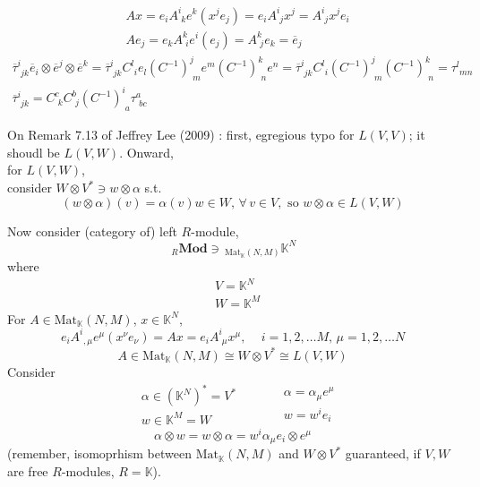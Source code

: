 \documentclass[10pt]{amsart}
\begin{document}
\begin{multicols*}{2}
\[
\begin{aligned}
	&	Ax = e_i A^i_{ \, \, k} e^k(x^j e_j) = e_i A^i_{ \,\,j} x^j = A^i_{ \, \, j} x^j e_i \\ 
 & Ae_j = e_k A^k_{ \, \, i} e^i (e_j) = A^k_{ \,\, j} e_k = \overline{e}_j
\end{aligned}
\]
\[
\begin{gathered}
\overline{\tau}^i_{ \,\, jk} \overline{e}_i \otimes \overline{e}^j \otimes \overline{e}^k = \overline{\tau}^i_{ \, \, jk} C^l_{ \, \, i} e_l (C^{-1})^j_{ \,\, m} e^m(C^{-1})^k_{ \, \, n} e^n = \overline{\tau}^i_{ \, \, jk} C^l_{ \, \, i } (C^{-1})^j_{ \,\, m} (C^{-1})^k_{ \,\, n} = \tau^l_{ \,\, mn}   \\
\overline{\tau}^i_{ \,\, jk} = C^c_{ \,\, k} C^b_{ \,\, j} (C^{-1})^i_{ \,\, a} \tau^a_{\,\, bc}
\end{gathered}
\]



On Remark 7.13 of Jeffrey Lee (2009) \cite{JLee2009}:  first, egregious typo for $L(V,V)$; it shoudl be $L(V,W)$.  Onward, \\
for $L(V,W)$, \\
consider $W\otimes V^* \ni w\otimes \alpha$ s.t.
\[
(w\otimes \alpha)(v) = \alpha(v)w\in W, \, \forall \, v\in V, \text{ so } w\otimes \alpha \in L(V,W)
\]

Now consider (category of) left $R$-module, 
\begin{equation}
{\,}_R\textbf{Mod} \ni {\,}_{\text{Mat}_{\mathbb{K}}(N,M) } \mathbb{K}^N
\end{equation}
where
\[
\begin{aligned}
	& V=\mathbb{K}^N \\ 
&	  W = \mathbb{K}^M
\end{aligned}
\]
For $A\in \text{Mat}_{\mathbb{K}}(N,M)$, $x\in \mathbb{K}^N$, 
\[
e_i A^i_{ \,\ , \mu} e^{\mu}(x^{\nu} e_{\nu}) = Ax = e_iA^i_{\,\, \mu} x^{\mu} , \quad \, i=1,2,\dots M, \, \mu = 1,2, \dots N
\]
\[
A\in \text{Mat}_{\mathbb{K}}(N,M) \cong W\otimes V^* \cong L(V,W)
\]
Consider 
\[
\begin{aligned}
	& \alpha \in (\mathbb{K}^N)^* = V^* \\
	& w\in \mathbb{K}^M = W
\end{aligned} \qquad \, \begin{aligned}
	& \alpha = \alpha_{\mu} e^{\mu} \\ 
	& w=w^ie_i
\end{aligned}
\]
\[
\alpha \otimes w = w \otimes \alpha = w^i\alpha_{\mu} e_i \otimes e^{\mu}
\]
(remember, isomoprhism between $\text{Mat}_{\mathbb{K}}(N,M)$ and $W\otimes V^*$ guaranteed, if $V,W$ are free $R$-modules, $R=\mathbb{K}$).


\end{multicols*}
\end{document}

